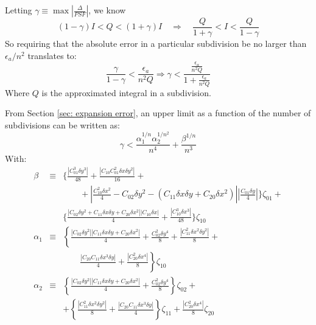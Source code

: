 \documentclass{article}
\begin{document}
Letting $\gamma\equiv\max\left|\frac{\Delta}{PSF}\right|$, we know
\begin{displaymath}
	(1-\gamma)I<Q<(1+\gamma)I\quad \Longrightarrow\quad
	\frac{Q}{1+\gamma}<I<\frac{Q}{1-\gamma}
\end{displaymath}
So requiring that the absolute error in a particular subdivision be no larger
than $\epsilon_a/n^2$ translates to:
\begin{displaymath}
	\frac{\gamma}{1-\gamma} <\frac{\epsilon_a}{n^2Q} \Longrightarrow
	\gamma < \frac{\frac{\epsilon_a}{n^2Q}}{1+\frac{\epsilon_a}{n^2Q}}
\end{displaymath}
Where $Q$ is the approximated integral in a subdivision.

From Section \ref{sec: expansion error}, an upper limit as a function of the
number of subdivisions can be written as:
\begin{equation}
	\gamma<\frac{\alpha_1^{1/n}\alpha_2^{1/n^2}}{n^4}+
	\frac{\beta^{1/n}}{n^3}
	\label{eq: error n scaling}
\end{equation}
With:
\begin{eqnarray}
	\beta&\equiv&
	\Bigg\{\frac{\left|C_{01}^3\delta y^3\right|}{48}+
		\frac{\left|C_{10}C_{01}^2\delta x\delta y^2\right|}{16}+
	\nonumber\\&&\quad\quad
		{}+\left|\frac{C_{10}^2\delta x^2}{4} - C_{02}\delta y^2
			-\left(C_{11}\delta x\delta y+C_{20}\delta x^2\right)
		\right|\left|\frac{C_{01}\delta y}{4}\right|\Bigg\}\zeta_{01}+
	\nonumber\\&&
	\Bigg\{
		\frac{\left|C_{02}\delta y^2 + C_{11}\delta x\delta y +
		C_{20}\delta x^2\right|\left|C_{10}\delta x\right|}{4}+
		\frac{\left|C_{10}^3\delta x^3\right|}{48}
	\Bigg\}\zeta_{10}\\
%
	\alpha_1&\equiv&
	\left\{\frac{\left|C_{02}\delta y^2\right|
	\left|C_{11}\delta x\delta y+C_{20}\delta x^2\right|}{4}+
	\frac{C_{02}^2\delta y^4}{8}
	+\frac{\left|C_{11}^2\delta x^2 \delta y^2\right|}{8}+
	\right.\nonumber\\&&
	\quad\quad\left.
	\frac{\left|C_{20}C_{11}\delta x^3 \delta y\right|}{4}
	+\frac{\left|C_{20}^2\delta x^4\right|}{8}\right\}\zeta_{10}\\
%
	\alpha_2&\equiv&
	\left\{\frac{\left|C_{02}\delta y^2\right|
	\left|C_{11}\delta x\delta y+C_{20}\delta x^2\right|}{4}+
	\frac{C_{02}^2\delta y^4}{8}
	\right\}\zeta_{02}+
	\nonumber\\&&
	+\left\{\frac{\left|C_{11}^2\delta x^2 \delta y^2\right|}{8}+
	\frac{\left|C_{20}C_{11}\delta x^3 \delta y\right|}{4}\right\}
	\zeta_{11}
	+\frac{\left|C_{20}^2\delta x^4\right|}{8}\zeta_{20}
\end{eqnarray}
\end{document}
